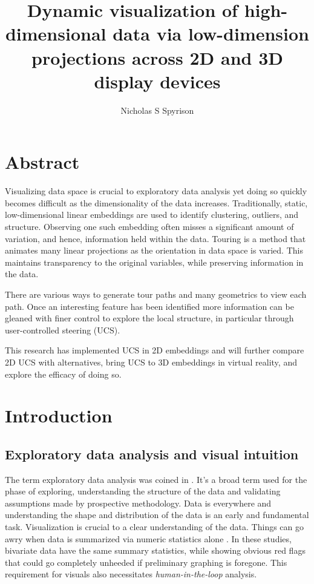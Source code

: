 \documentclass{monashthesis}
\author{Nicholas S Spyrison}
\title{Dynamic visualization of high-dimensional data via low-dimension
projections across 2D and 3D display devices}
\begin{document}

\titlepage

{\sf\tighttoc\doublespacing}

\chapter*{Abstract}\label{abstract}

Visualizing data space is crucial to exploratory data analysis yet doing
so quickly becomes difficult as the dimensionality of the data
increases. Traditionally, static, low-dimensional linear embeddings are
used to identify clustering, outliers, and structure. Observing one such
embedding often misses a significant amount of variation, and hence,
information held within the data. Touring is a method that animates many
linear projections as the orientation in data space is varied. This
maintains transparency to the original variables, while preserving
information in the data.

There are various ways to generate tour paths and many geometrics to
view each path. Once an interesting feature has been identified more
information can be gleaned with finer control to explore the local
structure, in particular through user-controlled steering (UCS).

This research has implemented UCS in 2D embeddings and will further
compare 2D UCS with alternatives, bring UCS to 3D embeddings in virtual
reality, and explore the efficacy of doing so.

\clearpage{}\setcounter{page}{0}

\chapter{Introduction}\label{ch:introduction}

\section{Exploratory data analysis and visual
intuition}\label{exploratory-data-analysis-and-visual-intuition}

The term exploratory data analysis was coined in
\textcite{tukey_exploratory_1977}. It's a broad term used for the phase
of exploring, understanding the structure of the data and validating
assumptions made by prospective methodology. Data is everywhere and
understanding the shape and distribution of the data is an early and
fundamental task. Visualization is crucial to a clear understanding of
the data. Things can go awry when data is summarized via numeric
statistics alone \autocites{anscombe_graphs_1973}{matejka_same_2017}. In
these studies, bivariate data have the same summary statistics, while
showing obvious red flags that could go completely unheeded if
preliminary graphing is foregone. This requirement for visuals also
necessitates \emph{human-in-the-loop} analysis.
\end{document}
